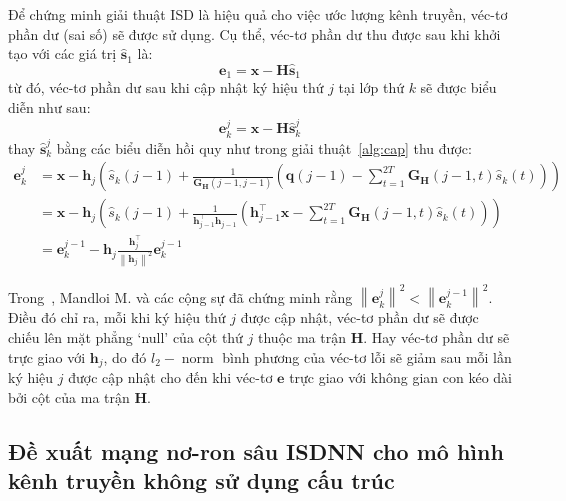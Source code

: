 Để chứng minh giải thuật ISD là hiệu quả cho việc ước lượng kênh truyền, véc-tơ phần dư (sai số) sẽ được sử dụng. Cụ thể, véc-tơ phần dư thu được sau khi khởi tạo với các giá trị $\hat{\mathbf{s}}_1$ là:
\begin{equation}
    \mathbf{e}_1 = \mathbf{x} - \mathbf{H} \hat{\mathbf{s}}_1
\end{equation}
từ đó, véc-tơ phần dư sau khi cập nhật ký hiệu thứ $j$ tại lớp thứ $k$ sẽ được biểu diễn như sau:
\begin{equation}
    \mathbf{e}_k^{j}=\mathbf{x}-\mathbf{H} \hat{\mathbf{s}}_k^j
\end{equation}
thay $\hat{\mathbf{s}}_k^j$ bằng các biểu diễn hồi quy như trong giải thuật~\ref{alg:cap} thu được:
\begin{equation}
\label{eq:eupdate}
\begin{aligned}
    \mathbf{e}_k^{j} & =\mathbf{x}-\mathbf{h}_j\left(\hat{s}_k(j-1)+\frac{1}{\mathbf{G}_\mathbf{H}(j-1, j-1)}\left(\mathbf{q}(j-1)-\sum_{t=1}^{2T} \mathbf{G}_\mathbf{H}(j-1, t) \hat{s}_k(t)\right)\right) \\
    & =\mathbf{x}-\mathbf{h}_j\left(\hat{s}_k(j-1)+\frac{1}{\mathbf{h}^\top_{j-1} \mathbf{h}_{j-1}}\left(\mathbf{h}_{j-1}^\top \mathbf{x}-\sum_{t=1}^{2T} \mathbf{G}_\mathbf{H}(j-1, t) \hat{s}_k(t)\right)\right) \\
    & =\mathbf{e}_k^{j-1}-\mathbf{h}_{j} \frac{\mathbf{h}_j^\top}{\left\|\mathbf{h}_j\right\|^2} \mathbf{e}_k^{j-1}
    \end{aligned}
\end{equation}

Trong~\cite{Mandloi2017}, Mandloi M. và các cộng sự đã chứng minh rằng $\left\|\mathbf{e}_k^{j}\right\|^2<\left\|\mathbf{e}_k^{j-1}\right\|^2$. Điều đó chỉ ra, mỗi khi ký hiệu thứ $j$ được cập nhật, véc-tơ phần dư sẽ được chiếu lên mặt phẳng `null' của cột thứ $j$ thuộc ma trận $\mathbf{H}$. Hay véc-tơ phần dư sẽ trực giao với $\mathbf{h}_j$, do đó $l_2-\operatorname{norm}$ bình phương của véc-tơ lỗi sẽ giảm sau mỗi lần ký hiệu $j$ được cập nhật cho đến khi véc-tơ $\mathbf{e}$ trực giao với không gian con kéo dài bởi cột của ma trận $\mathbf{H}$.

\subsection{Đề xuất mạng nơ-ron sâu ISDNN cho mô hình kênh truyền không sử dụng cấu trúc}
\label{sec:ISNN_nonstructured}

